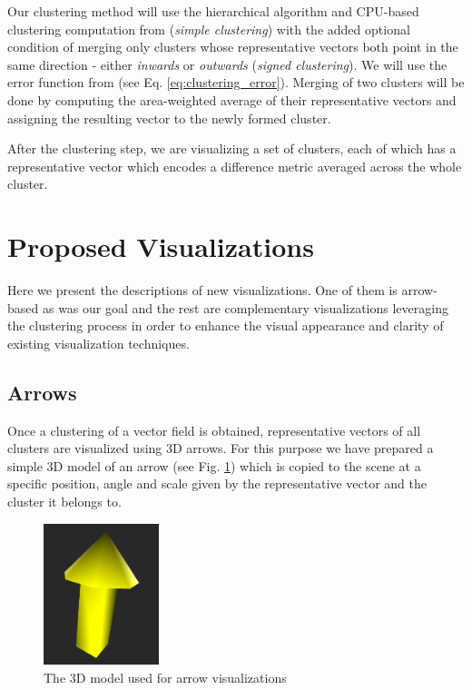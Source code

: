 Our clustering method will use the hierarchical algorithm and CPU-based clustering computation from \citet{Telea99} ({\it simple clustering}) with the added optional condition of merging only clusters whose representative vectors both point in the same direction - either {\it inwards} or {\it outwards} ({\it signed clustering}). We will use the error function from \citet{Peng12} (see Eq. \ref{eq:clustering_error}). Merging of two clusters will be done by computing the area-weighted average of their representative vectors and assigning the resulting vector to the newly formed cluster.

After the clustering step, we are visualizing a set of clusters, each of which has a representative vector which encodes a difference metric averaged across the whole cluster.
\section{Proposed Visualizations}
\label{sec:analysis-visualizations}

Here we present the descriptions of new visualizations. One of them is arrow-based as was our goal and the rest are complementary visualizations leveraging the clustering process in order to enhance the visual appearance and clarity of existing visualization techniques.

\subsection{Arrows}
\label{subsec:analysis-visualizations-arrows}

Once a clustering of a vector field is obtained, representative vectors of all clusters are visualized using 3D arrows. For this purpose we have prepared a simple 3D model of an arrow (see Fig. \ref{fig:meshdiff-arrow_model8}) which is copied to the scene at a specific position, angle and scale given by the representative vector and the cluster it belongs to.

\begin{figure}[h]
\centering
\includegraphics[width=0.3\textwidth]{./img/arrow_model.PNG}
\caption[Arrow Model]{The 3D model used for arrow visualizations}
\label{fig:meshdiff-arrow_model8}
\end{figure}

